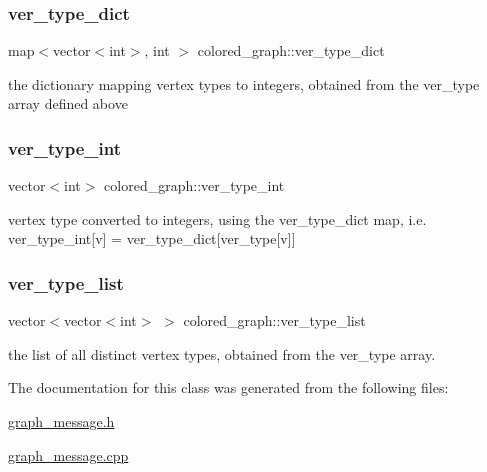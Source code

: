 \mbox{\label{classcolored__graph_aeb780762429ddac375799f4a45405712}} 
\subsubsection{\texorpdfstring{ver\+\_\+type\+\_\+dict}{ver\_type\_dict}}
{\footnotesize\ttfamily map$<$vector$<$int$>$, int $>$ colored\+\_\+graph\+::ver\+\_\+type\+\_\+dict}



the dictionary mapping vertex types to integers, obtained from the ver\+\_\+type array defined above 

\mbox{\label{classcolored__graph_a491ed2ea1a65118af02ec606c8d44c0a}} 
\subsubsection{\texorpdfstring{ver\+\_\+type\+\_\+int}{ver\_type\_int}}
{\footnotesize\ttfamily vector$<$int$>$ colored\+\_\+graph\+::ver\+\_\+type\+\_\+int}



vertex type converted to integers, using the ver\+\_\+type\+\_\+dict map, i.\+e. ver\+\_\+type\+\_\+int\mbox{[}v\mbox{]} = ver\+\_\+type\+\_\+dict\mbox{[}ver\+\_\+type\mbox{[}v\mbox{]}\mbox{]} 

\mbox{\label{classcolored__graph_a3a1ae8abac458d20a2afb4aa48bbc956}} 
\subsubsection{\texorpdfstring{ver\+\_\+type\+\_\+list}{ver\_type\_list}}
{\footnotesize\ttfamily vector$<$vector$<$int$>$ $>$ colored\+\_\+graph\+::ver\+\_\+type\+\_\+list}



the list of all distinct vertex types, obtained from the ver\+\_\+type array. 



The documentation for this class was generated from the following files\+:\begin{DoxyCompactItemize}
\item 
\hyperlink{graph__message_8h}{graph\+\_\+message.\+h}\item 
\hyperlink{graph__message_8cpp}{graph\+\_\+message.\+cpp}\end{DoxyCompactItemize}
